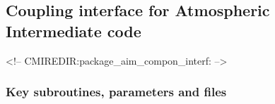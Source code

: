 \subsection{Coupling interface for Atmospheric Intermediate code}
\label{sec:pkg:aim_compon_interf}
\begin{rawhtml}
<!-- CMIREDIR:package_aim_compon_interf: -->
\end{rawhtml}

\subsubsection{Key subroutines, parameters and files}
\label{sec:pkg:aim_compon_interf:implementation_synopsis}

